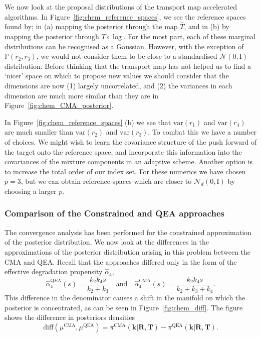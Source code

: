 \documentclass[final]{siamltex}
\begin{document}
We now look at the proposal distributions of the transport map accelerated algorithms. In Figure~\ref{fig:chem_reference_spaces}, we see the reference spaces found by; in (a) mapping the posterior through the map $\hat{T}$, and in (b) by mapping the posterior through $T\circ\log$. For the most part, each of these marginal distributions can be recognised as a Gaussian. However, with the exception of $\mathbb{P}(r_2,r_3)$, we would not consider them to be close to a standardised $\mathcal{N}(0, \text{I})$ distribution. Before thinking that the transport map has not helped us to find a `nicer' space on which to propose new values we should consider that the dimensions are now (1) largely uncorrelated, and (2) the variances in each dimension are much more similar than they are in Figure~\ref{fig:chem_CMA_posterior}.

In Figure~\ref{fig:chem_reference_spaces} (b) we see that
$\text{var}(r_1)$ and $\text{var}(r_4)$ are much smaller than
$\text{var}(r_2)$ and $\text{var}(r_3)$. To combat this we have a
number of choices. We might wish to learn the covariance structure of
the push forward of the target onto the reference space, and
incorporate this information into the covariances of the mixture
components in an adaptive scheme. Another option is to increase the total order of our index set. For these numerics we have chosen $p=3$, but we can obtain reference spaces which are closer to $\mathcal{N}_d(0, \text{I})$ by choosing a larger $p$.

\subsubsection{Comparison of the Constrained and QEA approaches}

The convergence analysis has been performed for the constrained
approximation of the posterior distribution. We now look at the
differences in the approximations of the posterior distribution
arising in this problem between the CMA and QEA. Recall that the approaches differed only in the form of the effective degradation propensity $\hat{\alpha}_4$,
\[
	\hat{\alpha}_4^{\text{QEA}}(s) = \frac{k_2k_4s}{k_2+k_3} \quad \text{and} \quad \hat{\alpha}_4^{\text{CMA}}(s) = \frac{k_2k_4s}{k_2+k_3+k_4}.
\]
This difference in the denominator causes a shift in the manifold on
which the posterior is concentrated, as can be seen in
Figure~\ref{fig:chem_diff}. The figure shows the difference in
posteriors densities
\begin{equation}\label{eqn:chem_diff}
	\text{diff}(\mu^{\text{CMA}}, \mu^{\text{QEA}}) = \pi^{\text{CMA}}(\mathbf{k}|\mathbf{R},\mathbf{T}) - \pi^{\text{QEA}}(\mathbf{k}|\mathbf{R},\mathbf{T}).
\end{equation}
\end{document}
